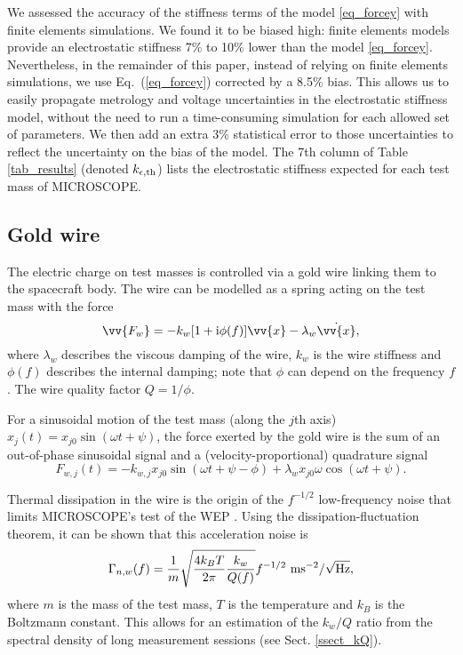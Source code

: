 \documentclass[12pt]{iopart}
\begin{document}
We assessed the accuracy of the stiffness terms of the model \eqref{eq_forcey} with finite elements simulations. We found it to be biased high: finite elements models provide an electrostatic stiffness 7\% to 10\% lower than the model \eqref{eq_forcey}. Nevertheless, in the remainder of this paper, instead of relying on finite elements simulations, we use Eq.~(\ref{eq_forcey}) corrected by a 8.5\% bias. This allows us to easily propagate metrology and voltage uncertainties in the electrostatic stiffness model, without the need to run a time-consuming simulation for each allowed set of parameters. We then add an extra 3\% statistical error to those uncertainties to reflect the uncertainty on the bias of the model.
The 7th column of Table \ref{tab_results} (denoted $k_{\epsilon, {\rm th}}$) lists the electrostatic stiffness expected for each test mass of MICROSCOPE.



\subsection{Gold wire} \label{ssect_gw}

The electric charge on test masses is controlled via a gold wire linking them to the spacecraft body. The wire can be modelled as a spring acting on the test mass with the force
\begin{equation}
\vv{F_w} = -k_w [1+ {\rm i}\phi(f)] \vv{x} - \lambda_w \dot{\vv{x}},
\end{equation}
where $\lambda_w$ describes the viscous damping of the wire, $k_w$ is the wire stiffness and $\phi(f)$ describes the internal damping; note that $\phi$ can depend on the frequency $f$. The wire quality factor $Q=1/\phi$.

For a sinusoidal motion of the test mass (along the $j$th axis) $x_j(t) = x_{j0} \sin(\omega t + \psi)$, the force exerted by the gold wire is the sum of an out-of-phase sinusoidal signal \cite{saulson90} and a (velocity-proportional) quadrature signal
\begin{equation}
F_{w,j}(t) = -k_{w,j} x_{j0} \sin(\omega t + \psi - \phi) + \lambda_w x_{j0} \omega \cos(\omega t + \psi).
\end{equation}

Thermal dissipation in the wire is the origin of the $f^{-1/2}$ low-frequency noise that limits MICROSCOPE's test of the WEP \cite{touboul17}. %
Using the dissipation-fluctuation theorem, it can be shown that this acceleration noise is \cite{saulson90, willemenot00}
\begin{equation} \label{eq_goldwirePSD}
\Gamma_{n,w}(f) = \frac{1}{m} \sqrt{\frac{4k_BT}{2\pi} \frac{k_w}{Q(f)}}f^{-1/2} \,\, {\rm m s}^{-2} / \sqrt{\rm Hz},
\end{equation}
where $m$ is the mass of the test mass, $T$ is the temperature and $k_B$ is the Boltzmann constant.
This allows for an estimation of the $k_w/Q$ ratio from the spectral density of long measurement sessions (see Sect. \ref{ssect_kQ}).
\end{document}

